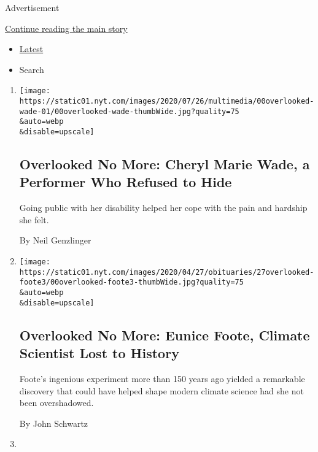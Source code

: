 Advertisement

\protect\hyperlink{after-mid1}{Continue reading the main story}

\begin{itemize}
\tightlist
\item
  \protect\hyperlink{stream-panel}{Latest}
\item
  Search
\end{itemize}

\begin{enumerate}
\def\labelenumi{\arabic{enumi}.}
\item
  \href{/2020/07/23/obituaries/cheryl-marie-wade-overlooked.html}{}

  \texttt{[image: https://static01.nyt.com/images/2020/07/26/multimedia/00overlooked-wade-01/00overlooked-wade-thumbWide.jpg?quality=75\\\&auto=webp\\\&disable=upscale]}

  \hypertarget{overlooked-no-more-cheryl-marie-wade-a-performer-who-refused-to-hide}{%
  \subsection{Overlooked No More: Cheryl Marie Wade, a Performer Who
  Refused to
  Hide}\label{overlooked-no-more-cheryl-marie-wade-a-performer-who-refused-to-hide}}

  Going public with her disability helped her cope with the pain and
  hardship she felt.

  By Neil Genzlinger
\item
  \href{/2020/04/21/obituaries/eunice-foote-overlooked.html}{}

  \texttt{[image: https://static01.nyt.com/images/2020/04/27/obituaries/27overlooked-foote3/00overlooked-foote3-thumbWide.jpg?quality=75\\\&auto=webp\\\&disable=upscale]}

  \hypertarget{overlooked-no-more-eunice-foote-climate-scientist-lost-to-history}{%
  \subsection{Overlooked No More: Eunice Foote, Climate Scientist Lost
  to
  History}\label{overlooked-no-more-eunice-foote-climate-scientist-lost-to-history}}

  Foote's ingenious experiment more than 150 years ago yielded a
  remarkable discovery that could have helped shape modern climate
  science had she not been overshadowed.

  By John Schwartz
\item
  \href{/2020/04/09/obituaries/fn-souza-overlooked.html}{}


\end{enumerate}
